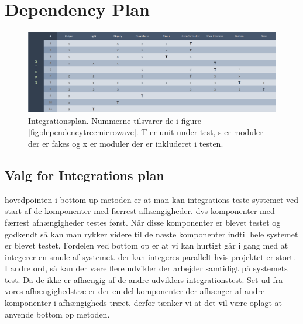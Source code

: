 \section{Dependency Plan}

\begin{figure}[H]
	\centering
	\includegraphics[width=1\linewidth]{../Diagrams/IntegrationPlan}
	\caption[Integration Plan]{Integrationsplan. Nummerne tilsvarer de i figure \ref{fig:dependencytreemicrowave}. T er unit under test, s er moduler der er fakes og x er moduler der er inkluderet i testen.}
	\label{fig:integrationplan}
\end{figure}

\subsection{Valg for Integrations plan}
hovedpointen i bottom up metoden er at man kan integrations teste systemet ved start af de komponenter med færrest afhængigheder. dvs komponenter med færrest afhængigheder testes først. Når disse komponenter er blevet testet og godkendt så kan man rykker videre til de næste komponenter indtil hele systemet er blevet testet. \medskip
Fordelen ved bottom op er at vi kan hurtigt går i gang med at integerer en smule af systemet. der kan integeres parallelt hvis projektet er stort. I andre ord, så kan der være flere udvikler der arbejder samtidigt på systemets test. Da de ikke er afhængig af de andre udviklers integrationstest. \medskip
Set ud fra vores afhængighedstræ er der en del komponenter der afhænger af andre komponenter i afhængigheds træet. derfor tænker vi at det vil være oplagt at anvende bottom op metoden.

